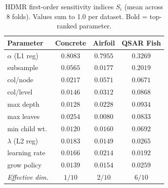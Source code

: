 \begin{table}[htbp]
\centering
\caption{HDMR first-order sensitivity indices $S_i$ (mean across 8 folds). Values sum to 1.0 per dataset. Bold = top-ranked parameter.}
\label{tab:sensitivity}
\begin{tabular}{lccc}
\toprule
\textbf{Parameter} & \textbf{Concrete} & \textbf{Airfoil} & \textbf{QSAR Fish} \\
\midrule
$\alpha$ (L1 reg) & $0.8083$ & $0.7955$ & $0.3269$ \\
subsample & $0.0565$ & $0.0177$ & $0.2019$ \\
col/node & $0.0217$ & $0.0571$ & $0.0671$ \\
col/level & $0.0146$ & $0.0312$ & $0.0868$ \\
max depth & $0.0128$ & $0.0228$ & $0.0934$ \\
max leaves & $0.0254$ & $0.0080$ & $0.0833$ \\
min child wt. & $0.0120$ & $0.0160$ & $0.0692$ \\
$\lambda$ (L2 reg) & $0.0183$ & $0.0149$ & $0.0265$ \\
learning rate & $0.0166$ & $0.0214$ & $0.0192$ \\
grow policy & $0.0139$ & $0.0154$ & $0.0259$ \\
\midrule
\textit{Effective dim.} & $1/10$ & $2/10$ & $6/10$ \\
\bottomrule
\end{tabular}
\end{table}
